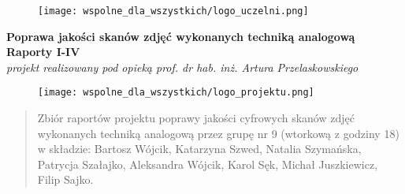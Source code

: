 \documentclass[]{mwart}
\begin{document}
\thispagestyle{empty}

\begin{figure}[h]
    \centering
    \texttt{[image: wspolne\_dla\_wszystkich/logo\_uczelni.png]}
\end{figure}


\begin{center}
    {\LARGE \textbf{Poprawa jakości skanów zdjęć wykonanych techniką analogową
        }} \\[0.3cm]
    {\large \textbf{Raporty I-IV}} \\[0.2cm]
    \textit{projekt realizowany pod opieką prof. dr hab. inż. Artura Przelaskowskiego}

\end{center}

\begin{figure}[h]
    \centering
    \texttt{[image: wspolne\_dla\_wszystkich/logo\_projektu.png]}
\end{figure}

\vfill
\begin{abstract}
    Zbiór raportów projektu poprawy jakości cyfrowych skanów zdjęć wykonanych techniką
    analogową przez grupę nr 9 (wtorkową z godziny 18)
    w składzie:  Bartosz Wójcik, Katarzyna Szwed, Natalia Szymańska,
    Patrycja Szałajko, Aleksandra Wójcik, Karol Sęk, Michał Juszkiewicz, Filip Sajko.
\end{abstract}


\newpage
\tableofcontents
\newpage
\end{document}
